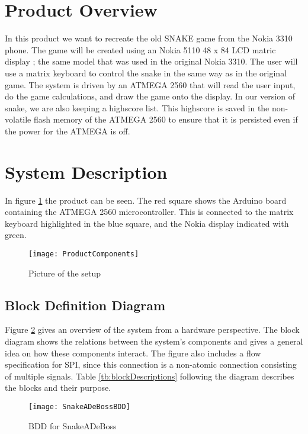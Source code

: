 \section{Product Overview}
	In this product we want to recreate the old SNAKE game from the Nokia 3310 phone. The game will be created using an Nokia 5110 48 x 84 LCD matric display \cite{NokiaDisplay}; the same model that was used in the original Nokia 3310. The user will use a matrix keyboard to control the snake in the same way as in the original game. The system is driven by an ATMEGA 2560 that will read the user input, do the game calculations, and draw the game onto the display. In our version of snake, we are also keeping a highscore list. This highscore is saved in the non-volatile flash memory of the ATMEGA 2560 to ensure that it is persisted even if the power for the ATMEGA is off.

\section{System Description}
	In figure \ref{ProductComponents} the product can be seen. The red square shows the Arduino board containing the ATMEGA 2560 microcontroller. This is connected to the matrix keyboard highlighted in the blue square, and the Nokia display indicated with green. 
	
	\begin{figure}[H]
		\texttt{[image: ProductComponents]}
		\centering
		\caption{Picture of the setup}
		\label{ProductComponents}
	\end{figure}


	\subsection{Block Definition Diagram}
		Figure \ref{fig:bdd} gives an overview of the system from a hardware perspective. The block diagram shows the relations between the system's components and gives a general idea on how these components interact. The figure also includes a flow specification for SPI, since this connection is a non-atomic connection consisting of multiple signals. Table \ref{tb:blockDescriptions} following the diagram describes the blocks and their purpose.
		
		\begin{figure}[H]
			\texttt{[image: SnakeADeBossBDD]}
			\centering
			\caption{BDD for SnakeADeBoss}
			\label{fig:bdd}
		\end{figure}
		
